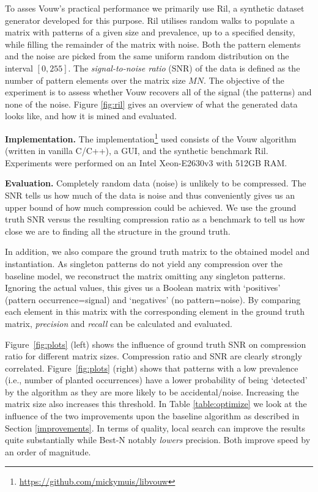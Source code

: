 \documentclass{llncs}
\begin{document}
To asses Vouw's practical performance we primarily use Ril, a synthetic dataset generator developed for this purpose. Ril utilises random walks to populate a matrix with patterns of a given size and prevalence, up to a specified density, while filling the remainder of the matrix with noise. Both the pattern elements and the noise are picked from the same uniform random distribution on the interval $[0,255]$. The \emph{signal-to-noise ratio} (SNR) of the data is defined as the number of pattern elements over the matrix size $MN$. The objective of the experiment is to assess whether Vouw recovers all of the signal (the patterns) and none of the noise. Figure \ref{fig:ril} gives an overview of what the generated data looks like, and how it is mined and evaluated.

\smallskip \noindent \textbf{Implementation.} %
The implementation\footnote{\url{https://github.com/mickymuis/libvouw}} used consists of the Vouw algorithm (written in vanilla C/C++), a GUI, and the synthetic benchmark Ril. Experiments were performed on an Intel Xeon-E2630v3 with 512GB RAM.

\smallskip \noindent \textbf{Evaluation.} %
Completely random data (noise) is unlikely to be compressed. The SNR tells us how much of the data is noise and thus conveniently gives us an upper bound of how much compression could be achieved. We use the ground truth SNR versus the resulting compression ratio as a benchmark to tell us how close we are to finding all the structure in the ground truth. 

In addition, we also compare the ground truth matrix to the obtained model and instantiation. As singleton patterns do not yield any compression over the baseline model, we reconstruct the matrix omitting any singleton patterns. Ignoring the actual values, this gives us a Boolean matrix with `positives' (pattern occurrence=signal) and `negatives' (no pattern=noise). By comparing each element in this matrix with the corresponding element in the ground truth matrix, \emph{precision} and \emph{recall} can be calculated and evaluated.

Figure~\ref{fig:plots} (left) shows the influence of ground truth SNR on compression ratio for different matrix sizes. Compression ratio and SNR are clearly strongly correlated. Figure~\ref{fig:plots} (right) shows that patterns with a low prevalence (i.e., number of planted occurrences) have a lower probability of being `detected' by the algorithm as they are more likely to be accidental/noise. Increasing the matrix size also increases this threshold. In Table \ref{table:optimize} we look at the influence of the two improvements upon the baseline algorithm as described in Section \ref{improvements}. In terms of quality, local search can improve the results quite substantially while Best-N notably \emph{lowers} precision. Both improve speed by an order of magnitude.%
\end{document}
